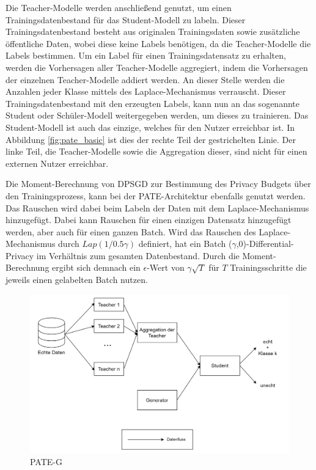 Die Teacher-Modelle werden anschließend genutzt, um einen Trainingsdatenbestand für das Student-Modell zu labeln.
Dieser Trainingsdatenbestand besteht aus originalen Trainingsdaten sowie zusätzliche öffentliche Daten, wobei diese keine Labels benötigen, da die Teacher-Modelle die Labels bestimmen.
Um ein Label für einen Trainingsdatensatz zu erhalten, werden die Vorhersagen aller Teacher-Modelle aggregiert, indem die Vorhersagen der einzelnen Teacher-Modelle addiert werden. 
An dieser Stelle werden die Anzahlen jeder Klasse mittels des Laplace-Mechanismus verrauscht.
Dieser Trainingsdatenbestand mit den erzeugten Labels, kann nun an das sogenannte Student oder Schüler-Modell weitergegeben werden, um dieses zu trainieren.
Das Student-Modell ist auch das einzige, welches für den Nutzer erreichbar ist.
In Abbildung \ref{fig:pate_basic} ist dies der rechte Teil der gestrichelten Linie.
Der linke Teil, die Teacher-Modelle sowie die Aggregation dieser, sind nicht für einen externen Nutzer erreichbar.

Die Moment-Berechnung von DPSGD \cite{P-28} zur Bestimmung des Privacy Budgets über den Trainingsprozess, kann bei der PATE-Architektur ebenfalls genutzt werden.
Das Rauschen wird dabei beim Labeln der Daten mit dem Laplace-Mechanismus hinzugefügt.
Dabei kann Rauschen für einen einzigen Datensatz hinzugefügt werden, aber auch für einen ganzen Batch.
Wird das Rauschen des Laplace-Mechanismus durch $Lap(1/ 0.5\gamma)$ definiert, hat ein Batch ($\gamma$,0)-Differential-Privacy im Verhältnis zum gesamten Datenbestand.
Durch die Moment-Berechnung ergibt sich demnach ein $\epsilon$-Wert von  $\gamma\sqrt{T}$ für $T$ Trainingsschritte die jeweils einen gelabelten Batch nutzen.

\begin{figure}[!htb]
    \centering
    \includegraphics[width=\textwidth]{figures/pate_g.png}
    \caption{PATE-G}
    \label{fig:pate_g}
\end{figure} 

